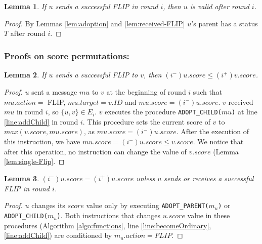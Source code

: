 \documentclass[twocolumn]{article}
\newtheorem{lemma}{Lemma}
\newcommand{\depends}[1]{}
\newcommand{\state}[3]{\ensuremath{(#2^{#3})#1}}
\newcommand{\uim}{\state{u}{i}{-}}
\newcommand{\uip}{\state{u}{i}{+}}
\newcommand{\vip}{\state{v}{i}{+}}
\begin{document}
\begin{lemma}
  \label{lem:FLIP-valid}
  If $u$ sends a successful FLIP in round $i$, then $u$ is valid after round $i$.
\depends{\ref{lem:adoption}, \ref{lem:received-FLIP}}
\end{lemma}

\begin{proof}
By Lemmas \ref{lem:adoption} and \ref{lem:received-FLIP} $u$'s parent has a status $T$ after round $i$.
 \end{proof}

\subsubsection{Proofs on score permutations:}



\begin{lemma}
\label{lem:received-FLIP-score}
  If $u$ sends a successful FLIP to $v$, then $\uim.score \leq \vip.score$.
\depends{\ref{lem:2FLIPs}, \ref{lem:single-Flip}}
\end{lemma}

\begin{proof}
$u$ sent a message $mu$ to $v$ at the beginning of round $i$ 
such that $mu.action=$ FLIP,  $mu.target=v.ID$ and $mu.score = \uim.score$. 
$v$ received $mu$ in round $i$, so $\{u,v\}\in E_i$.
$v$ executes the procedure
\texttt{ADOPT\_CHILD($mu$)} at line \ref{line:addChild} 
in round $i$. 
This procedure sets the current score of $v$ 
to $max(v.score,mu.score)$, as $mu.score=\uim.score$.
After the execution of this instruction, we have
$mu.score=\uim.score \leq v.score$. 
We notice that after this operation, no instruction 
can change the value of $v.score$  
(Lemma \ref{lem:single-Flip}.
 \end{proof}



\begin{lemma}
\label{lem:NO-FLIP-SCORE}
$\uim.score = \uip.score$ unless $u$ sends 
or receives a successful FLIP in round $i$.
\depends{\ref{lem:change_score}}
\end{lemma}
\begin{proof}

$u$ changes its $score$ value only by executing \texttt{ADOPT\_PARENT($m_u$)} or \texttt{ADOPT\_CHILD($m_u$)}. Both instructions that changes $u.score$ value in these procedures (Algorithm \ref{algo:functions}, line \ref{line:becomeOrdinary}, \ref{line:addChild}) are conditioned by $m_u.action=FLIP$.
\end{proof}
\end{document}
